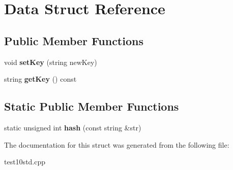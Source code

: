 \hypertarget{struct_data}{\section{Data Struct Reference}
\label{struct_data}
}
\subsection*{Public Member Functions}
\begin{DoxyCompactItemize}
\item 
\hypertarget{struct_data_a59bc7ecf5b7d3d4f358f87c87f62bcc3}{void {\bfseries set\+Key} (string new\+Key)}\label{struct_data_a59bc7ecf5b7d3d4f358f87c87f62bcc3}

\item 
\hypertarget{struct_data_aeca168b691885c7eb893f01ed54dabd9}{string {\bfseries get\+Key} () const }\label{struct_data_aeca168b691885c7eb893f01ed54dabd9}

\end{DoxyCompactItemize}
\subsection*{Static Public Member Functions}
\begin{DoxyCompactItemize}
\item 
\hypertarget{struct_data_af98f6d2d78472b7c6f5ab7d7c9357d99}{static unsigned int {\bfseries hash} (const string \&str)}\label{struct_data_af98f6d2d78472b7c6f5ab7d7c9357d99}

\end{DoxyCompactItemize}


The documentation for this struct was generated from the following file\+:\begin{DoxyCompactItemize}
\item 
test10std.\+cpp\end{DoxyCompactItemize}
